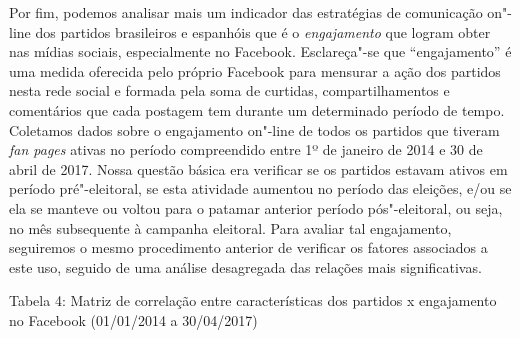 Por fim, podemos analisar mais um indicador das estratégias de
comunicação on"-line dos partidos brasileiros e espanhóis que é o
\emph{engajamento} que logram obter nas mídias sociais, especialmente no
Facebook. Esclareça"-se que ``engajamento'' é uma medida oferecida pelo
próprio Facebook para mensurar a ação dos partidos nesta rede social e
formada pela soma de curtidas, compartilhamentos e comentários que cada
postagem tem durante um determinado período de tempo. Coletamos dados
sobre o engajamento on"-line de todos os partidos que tiveram \emph{fan
pages} ativas no período compreendido entre 1º de janeiro de 2014 e 30
de abril de 2017. Nossa questão básica era verificar se os partidos
estavam ativos em período pré"-eleitoral, se esta atividade aumentou no
período das eleições, e/ou se ela se manteve ou voltou para o patamar
anterior período pós"-eleitoral, ou seja, no mês subsequente à campanha
eleitoral. Para avaliar tal engajamento, seguiremos o mesmo procedimento
anterior de verificar os fatores associados a este uso, seguido de uma
análise desagregada das relações mais significativas.

\begin{center}
Tabela 4: Matriz de correlação entre características dos partidos x
engajamento no Facebook (01/01/2014 a 30/04/2017)
\end{center}

